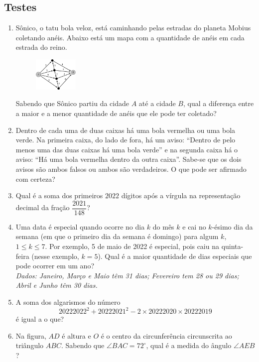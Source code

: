 \documentclass[12pt]{article}
\begin{document}
    \subsection{Testes}
      \begin{enumerate}[label=\textbf{\arabic*.}]
        \item Sônico, o tatu bola veloz, está caminhando pelas estradas do planeta Mobius coletando anéis. Abaixo está um mapa com a 
          quantidade de anéis em cada estrada do reino.           \begin{figure}[h]
            \centering
            \includegraphics[width=0.2\textwidth]{first.png}
          \end{figure}
          Sabendo que Sônico partiu da cidade $A$ até a cidade $B$, qual a diferença entre a maior e a menor quantidade de anéis que ele pode ter coletado?
        \item Dentro de cada uma de duas caixas há uma bola vermelha ou uma bola verde. Na primeira caixa, do lado de fora, há um aviso:
          ``Dentro de pelo menos uma das duas caixas há uma bola verde'' e na segunda caixa há o aviso: ``Há uma bola vermelha dentro da outra 
          caixa''. Sabe-se que os dois avisos são ambos falsos ou ambos são verdadeiros. O que pode ser afirmado com certeza?
        \item Qual é a soma dos primeiros $2022$ dígitos após a vírgula na representação decimal da fração $\dfrac{2021}{148}$?
        \item Uma data é especial quando ocorre no dia $k$ do mês $k$ e cai no $k$-ésimo dia da semana (em que o primeiro dia da semana é 
          domingo) para algum $k$, $1 \le k \le 7$. Por exemplo, 5 de maio de 2022 é especial, pois caiu na quinta-feira (nesse exemplo, $k=5$).
          Qual é a maior quantidade de dias especiais que pode ocorrer em um ano? \\

          \textit{Dados: Janeiro, Março e Maio têm 31 dias; Fevereiro tem 28 ou 29 dias; Abril e Junho têm 30 dias.} 
        \item A soma dos algarismos do número
          \[
            20222022^2 + 20222021^2 - 2 \times 20222020 \times 20222019
          \]
          é igual a o que?
        \item Na figura, $AD$ é altura e $O$ é o centro da circunferência circunscrita ao triângulo $ABC$. Sabendo que $\angle BAC = 72^\circ$, qual é a medida do ângulo $\angle AEB$?
          

\end{enumerate}
\end{document}
